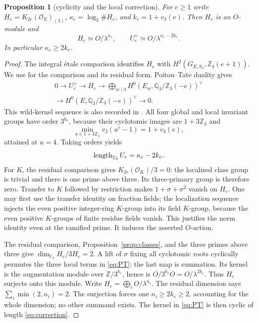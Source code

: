 \documentclass[11pt]{article}
\newtheorem{proposition}[theorem]{Proposition}
\theoremstyle{remark}\newtheorem{remark}[theorem]{Remark}
\newcommand{\Z}{\mathbb Z}\newcommand{\Q}{\mathbb Q}\newcommand{\F}{\mathbb F}
\newcommand{\Oa}{\mathcal O}\newcommand{\Cl}{\operatorname{Cl}}
\begin{document}
\begin{proposition}[cyclicity and the local correction]
\label{prop:structure}
For $e\geq1$ write $H_e=K_{2e}(\Oa_E)_{(3)}$, $\kappa_e=\log_3\#H_e$, and $k_e=1+v_3(e)$.
Then $H_e$ is an $O$-module and
\begin{equation}
 H_e\simeq O/\lambda^{\kappa_e},\qquad
 U_e^\vee\simeq O/\lambda^{\kappa_e-2k_e}.
 \label{eq:structure}
\end{equation}
In particular $\kappa_e\geq2k_e$.
\end{proposition}
\begin{proof}
The integral \'etale comparison identifies $H_e$ with $H^2(G_{E,S_3},\Z_3(e+1))$.
We use \citet[Chapter VI, Theorem 8.2, Corollary 8.3, and Example 8.3.1]{Weibel2013} for the comparison and its residual form.
Poitou--Tate duality gives
\begin{equation}
\begin{split}
0\longrightarrow U_e^\vee\longrightarrow H_e\longrightarrow
 \bigoplus_{w\mid3}H^0(E_w,\Q_3/\Z_3(-e))^\vee\\
 \longrightarrow H^0(E,\Q_3/\Z_3(-e))^\vee\longrightarrow0.
\end{split}\label{eq:PT}
\end{equation}
This wild-kernel sequence is also recorded in \citet[Section 1]{KolsterMovahhedi2000}.
All four global and local invariant groups have order $3^{k_e}$, because their cyclotomic images are $1+3\Z_3$ and
\[
 \min_{u\in1+3\Z_3}v_3(u^e-1)=1+v_3(e),
\]
attained at $u=4$.
Taking orders yields
\begin{equation}
 \len_{\Z_3}U_e=\kappa_e-2k_e.\label{eq:correction}
\end{equation}
For $K$, the residual comparison gives $K_{2e}(\Oa_K)/3=0$: the localized class group is trivial and there is one prime above three.
Its three-primary group is therefore zero.
Transfer to $K$ followed by restriction makes $1+\sigma+\sigma^2$ vanish on $H_e$.
One may first use the transfer identity on fraction fields; the localization sequence injects the even positive integer-ring $K$-group into its field $K$-group, because the even positive $K$-groups of finite residue fields vanish.
This justifies the norm identity even at the ramified prime.
It induces the asserted $O$-action.

The residual comparison, Proposition~\ref{prop:classes}, and the three primes above three give $\dim_{\F_3}H_e/3H_e=2$.
A lift of $\sigma$ fixing all cyclotomic roots cyclically permutes the three local terms in \eqref{eq:PT}; the last map is summation.
Its kernel is the augmentation module over $\Z/3^{k_e}$, hence is $O/3^{k_e}O=O/\lambda^{2k_e}$.
Thus $H_e$ surjects onto this module.
Write $H_e=\bigoplus_iO/\lambda^{n_i}$.
The residual dimension says $\sum_i\min(2,n_i)=2$.
The surjection forces one $n_i\geq2k_e\geq2$, accounting for the whole dimension; no other summand exists.
The kernel in \eqref{eq:PT} is then cyclic of length \eqref{eq:correction}.
\end{proof}
\end{document}
